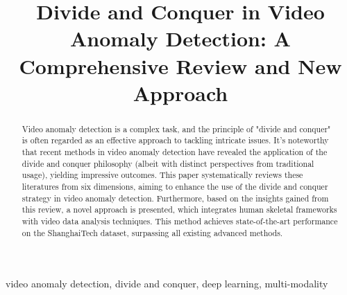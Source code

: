 \documentclass[conference]{IEEEtran}
\begin{document}
\title{Divide and Conquer in Video Anomaly Detection: A Comprehensive Review and New Approach\\

}

\author{
\and
{}
\and
{}
}
\maketitle

\begin{abstract}
Video anomaly detection is a complex task, and the principle of "divide and conquer" is often regarded as an effective approach to tackling intricate issues. It's noteworthy that recent methods in video anomaly detection have revealed the application of the divide and conquer philosophy (albeit with distinct perspectives from traditional usage), yielding impressive outcomes. This paper systematically reviews these literatures from six dimensions, aiming to enhance the use of the divide and conquer strategy in video anomaly detection. Furthermore, based on the insights gained from this review, a novel approach is presented, which integrates human skeletal frameworks with video data analysis techniques. This method achieves state-of-the-art performance on the ShanghaiTech dataset, surpassing all existing advanced methods.
\end{abstract}

\begin{IEEEkeywords}
video anomaly detection, divide and conquer, deep learning, multi-modality
\end{IEEEkeywords}
\end{document}
